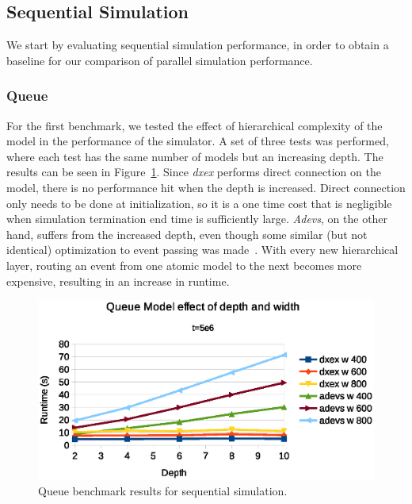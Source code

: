 \subsection{Sequential Simulation}
We start by evaluating sequential simulation performance, in order to obtain a baseline for our comparison of parallel simulation performance.

\subsubsection{Queue}
\label{4-seq-Queue}
For the first benchmark, we tested the effect of hierarchical complexity of the model in the performance of the simulator.
A set of three tests was performed, where each test has the same number of models but an increasing depth.
The results can be seen in Figure~\ref{fig:Queue_benchmark_seq}.
Since \textit{dxex} performs direct connection on the model, there is no performance hit when the depth is increased.
Direct connection only needs to be done at initialization, so it is a one time cost that is negligible when simulation termination end time is sufficiently large.
\textit{Adevs}, on the other hand, suffers from the increased depth, even though some similar (but not identical) optimization to event passing was made~\cite{adevs_opt}.
With every new hierarchical layer, routing an event from one atomic model to the next becomes more expensive, resulting in an increase in runtime.
\begin{figure}
	\center
	\includegraphics[width=\columnwidth]{fig/queue_fixed_sequential.eps}
	\caption{Queue benchmark results for sequential simulation.}
	\label{fig:Queue_benchmark_seq}
\end{figure}

